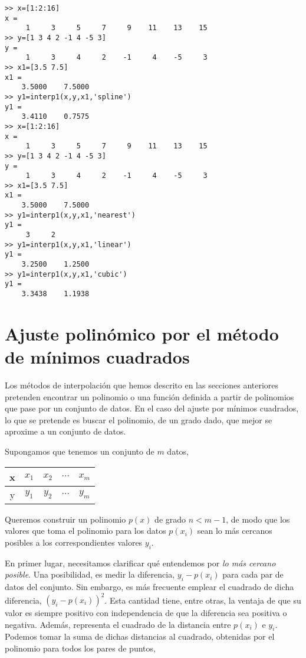 \begin{verbatim}
>> x=[1:2:16]
x =
     1     3     5     7     9    11    13    15
>> y=[1 3 4 2 -1 4 -5 3]
y =
     1     3     4     2    -1     4    -5     3
>> x1=[3.5 7.5]
x1 =
    3.5000    7.5000
>> y1=interp1(x,y,x1,'spline')
y1 =
    3.4110    0.7575
>> x=[1:2:16]
x =
     1     3     5     7     9    11    13    15
>> y=[1 3 4 2 -1 4 -5 3]
y =
     1     3     4     2    -1     4    -5     3
>> x1=[3.5 7.5]
x1 =
    3.5000    7.5000
>> y1=interp1(x,y,x1,'nearest')
y1 =
     3     2
>> y1=interp1(x,y,x1,'linear')
y1 =
    3.2500    1.2500
>> y1=interp1(x,y,x1,'cubic')
y1 =
    3.3438    1.1938
\end{verbatim}

\section{Ajuste polinómico por el método de mínimos cuadrados}\label{sec:mc} 
Los métodos de interpolación que hemos descrito en las secciones anteriores pretenden encontrar un polinomio o una función definida a partir de polinomios que pase por un conjunto de datos. En el caso del ajuste por mínimos cuadrados, lo que se pretende es buscar el polinomio, de un grado dado, que mejor se aproxime a un conjunto de datos.

Supongamos que tenemos un conjunto de $m$ datos, 

\begin{table}[h]
\centering
\begin{tabular}{c|cccc}
x&$x_1$&$x_2$&$\cdots$&$x_m$\\
\hline
y&$y_1$&$y_2$&$\cdots$&$y_m$
\end{tabular}
\end{table} 
 
Queremos construir un polinomio $p(x)$  de grado $n < m-1$, de modo que los valores que toma el polinomio para los datos $p(x_i)$ sean lo más cercanos posibles a los correspondientes valores $y_i$. 

En primer lugar, necesitamos clarificar qué entendemos por \emph{lo más cercano posible}.  Una posibilidad, es medir la diferencia, $y_i-p(x_i)$ para cada par de datos del conjunto. Sin embargo, es más frecuente emplear el cuadrado de dicha diferencia, $\left(y_i-p(x_i)\right)^2$. Esta cantidad tiene, entre otras, la ventaja de que su valor es siempre positivo con  independencia de que la diferencia sea positiva o negativa. Además, representa el cuadrado de la distancia entre $p(x_i)$ e $y_i$. Podemos tomar la suma de dichas distancias al cuadrado, obtenidas por el polinomio para todos los pares de puntos, 

